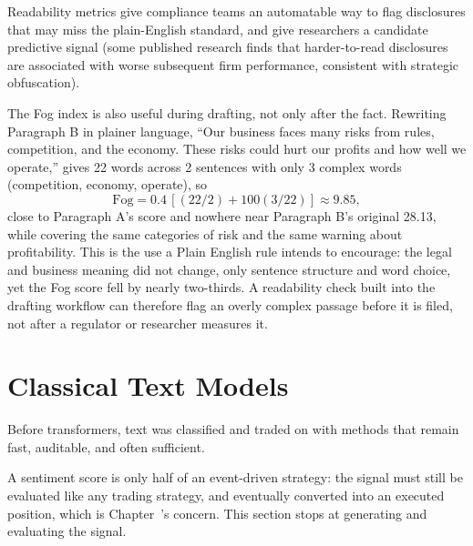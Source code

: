 \documentclass[../ai_in_finance]{subfiles}
\begin{document}
Readability metrics give compliance teams an automatable way to flag disclosures that may miss the plain-English standard, and give researchers a candidate predictive signal (some published research finds that harder-to-read disclosures are associated with worse subsequent firm performance, consistent with strategic obfuscation).

The Fog index is also useful during drafting, not only after the fact. Rewriting Paragraph B in plainer language, ``Our business faces many risks from rules, competition, and the economy. These risks could hurt our profits and how well we operate,'' gives 22 words across 2 sentences with only 3 complex words (competition, economy, operate), so
\begin{equation*}
\text{Fog} = 0.4\,[(22/2) + 100(3/22)] \approx 9.85,
\end{equation*}
close to Paragraph A's score and nowhere near Paragraph B's original 28.13, while covering the same categories of risk and the same warning about profitability. This is the use a Plain English rule intends to encourage: the legal and business meaning did not change, only sentence structure and word choice, yet the Fog score fell by nearly two-thirds. A readability check built into the drafting workflow can therefore flag an overly complex passage before it is filed, not after a regulator or researcher measures it.

\section{Classical Text Models}

Before transformers, text was classified and traded on with methods that remain fast, auditable, and often sufficient.

\label{sec:event-driven-signal}

A sentiment score is only half of an event-driven strategy: the signal must still be evaluated like any trading strategy, and eventually converted into an executed position, which is Chapter~'s concern. This section stops at generating and evaluating the signal.
\end{document}
